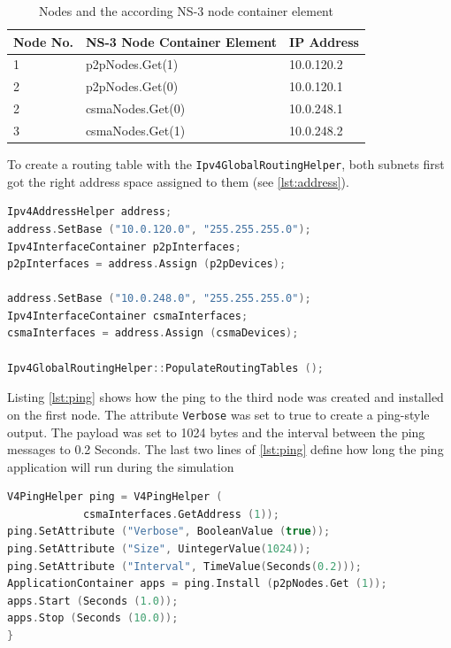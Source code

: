 \documentclass[parskip=full]{scrartcl}
\begin{document}
\begin{table}[hb]
	\centering
	\begin{tabular}{lll}
		\toprule
		\textbf{Node No.} & \textbf{NS-3 Node Container Element} & \textbf{IP Address}\\ \midrule
		1 & p2pNodes.Get(1) & 10.0.120.2 \\
		2 & p2pNodes.Get(0) & 10.0.120.1 \\
		2 & csmaNodes.Get(0) & 10.0.248.1 \\
		3 & csmaNodes.Get(1) & 10.0.248.2 \\
		\bottomrule
	\end{tabular}
	\caption{Nodes and the according NS-3 node container element}
	\label{tab:Nodes}
\end{table}

To create a routing table with the \verb|Ipv4GlobalRoutingHelper|, both subnets first got the right address space assigned to them (see \ref{lst:address}).

\begin{lstlisting}[language=c++, frame=single, captionpos=b, caption={IP address assignment and routing table creation}, label=lst:address]
Ipv4AddressHelper address;
address.SetBase ("10.0.120.0", "255.255.255.0");
Ipv4InterfaceContainer p2pInterfaces;
p2pInterfaces = address.Assign (p2pDevices);

address.SetBase ("10.0.248.0", "255.255.255.0");
Ipv4InterfaceContainer csmaInterfaces;
csmaInterfaces = address.Assign (csmaDevices);

Ipv4GlobalRoutingHelper::PopulateRoutingTables ();
\end{lstlisting}

Listing \ref{lst:ping} shows how the ping to the third node was created and installed on the first node. 
The attribute \verb|Verbose| was set to true to create a ping-style output. 
The payload was set to 1024 bytes and the interval between the ping messages to 0.2 Seconds.
The last two lines of \cref{lst:ping} define how long the ping application will run during the simulation

\begin{lstlisting}[language=c++, frame=single , captionpos=b, label=lst:ping]
V4PingHelper ping = V4PingHelper (
		    csmaInterfaces.GetAddress (1));
ping.SetAttribute ("Verbose", BooleanValue (true));
ping.SetAttribute ("Size", UintegerValue(1024));
ping.SetAttribute ("Interval", TimeValue(Seconds(0.2)));
ApplicationContainer apps = ping.Install (p2pNodes.Get (1));
apps.Start (Seconds (1.0));
apps.Stop (Seconds (10.0));
}
\end{lstlisting}
\end{document}
